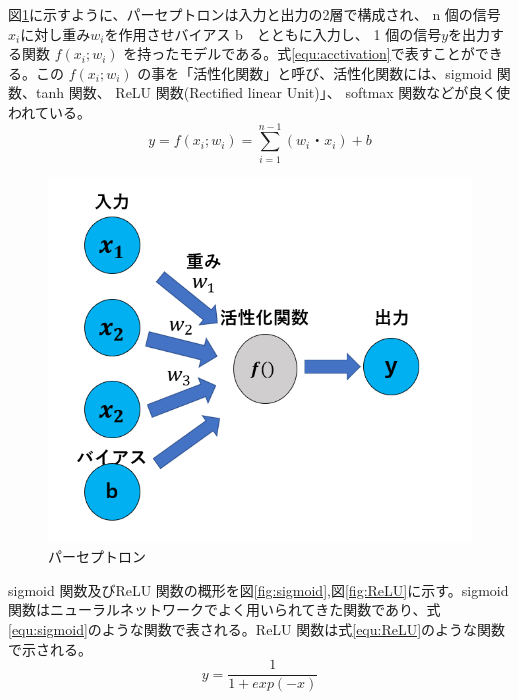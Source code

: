 図\ref{fig:perce}に示すように、パーセプトロンは入力と出力の2層で構成され、 n 個の信号$x_i$に対し重み$w_i$を作用させバイアス b　とともに入力し、 1 個の信号$y$を出力する関数 $f(x_i; w_i)$ を持ったモデルである。式\eqref{equ:acctivation}で表すことができる。この $f(x_i; w_i)$ の事を「活性化関数」と呼び、活性化関数には、sigmoid 関数、tanh 関数、 ReLU 関数(Rectified linear Unit)」、 softmax 関数などが良く使われている。 
\begin{equation}
    y = f(x_i; w_i) = \sum^{n-1}_{i=1}(w_i・x_i) + b
    \label{equ:acctivation}
\end{equation}
\begin{figure}[tb]
  \centering
  \includegraphics[clip, width=13cm]{fig/4/parceptron.png}
  \caption{パーセプトロン}
  \label{fig:perce}
\end{figure}
sigmoid 関数及びReLU 関数の概形を図\ref{fig:sigmoid},図\ref{fig:ReLU}に示す。sigmoid 関数はニューラルネットワークでよく用いられてきた関数であり、式\eqref{equ:sigmoid}のような関数で表される。ReLU 関数は式\eqref{equ:ReLU}のような関数で示される。
\begin{equation}
    y = \frac{1}{1+exp(-x)}
    \label{equ:sigmoid}
\end{equation}

